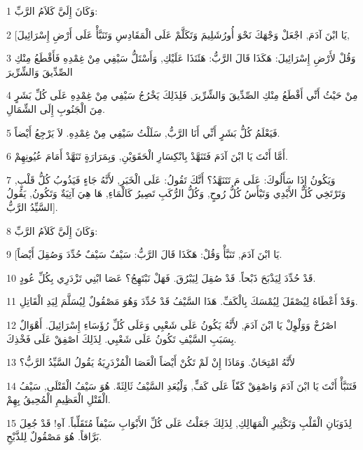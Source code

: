 \par 1 وَكَانَ إِلَيَّ كَلاَمُ الرَّبِّ:
\par 2 [يَا ابْنَ آدَمَ, اجْعَلْ وَجْهَكَ نَحْوَ أُورُشَلِيمَ وَتَكَلَّمْ عَلَى الْمَقَادِسِ وَتَنَبَّأْ عَلَى أَرْضِ إِسْرَائِيلَ,
\par 3 وَقُلْ لأَرْضِ إِسْرَائِيلَ: هَكَذَا قَالَ الرَّبُّ: هَئَنَذَا عَلَيْكِ, وَأَسْتَلُّ سَيْفِي مِنْ غِمْدِهِ فَأَقْطَعُ مِنْكِ الصِّدِّيقَ وَالشِّرِّيرَ
\par 4 مِنْ حَيْثُ أَنِّي أَقْطَعُ مِنْكِ الصِّدِّيقَ وَالشِّرِّيرَ, فَلِذَلِكَ يَخْرُجُ سَيْفِي مِنْ غِمْدِهِ عَلَى كُلِّ بَشَرٍ مِنَ الْجَنُوبِ إِلَى الشِّمَالِ.
\par 5 فَيَعْلَمُ كُلُّ بَشَرٍ أَنِّي أَنَا الرَّبُّ, سَلَلْتُ سَيْفِي مِنْ غِمْدِهِ. لاَ يَرْجِعُ أَيْضاً.
\par 6 أَمَّا أَنْتَ يَا ابْنَ آدَمَ فَتَنَهَّدْ بِانْكِسَارِ الْحَقَوَيْنِ, وَبِمَرَارَةٍ تَنَهَّدْ أَمَامَ عُيُونِهِمْ.
\par 7 وَيَكُونُ إِذَا سَأَلُوكَ: عَلَى مَ تَتَنَهَّدُ؟ أَنَّكَ تَقُولُ: عَلَى الْخَبَرِ, لأَنَّهُ جَاءٍ فَيَذُوبُ كُلُّ قَلْبٍ, وَتَرْتَخِي كُلُّ الأَيْدِي وَتَيْأَسُ كُلُّ رُوحٍ, وَكُلُّ الرُّكَبِ تَصِيرُ كَالْمَاءِ, هَا هِيَ آتِيَةٌ وَتَكُونُ, يَقُولُ السَّيِّدُ الرَّبُّ].
\par 8 وَكَانَ إِلَيَّ كَلاَمُ الرَّبِّ:
\par 9 [يَا ابْنَ آدَمَ, تَنَبَّأْ وَقُلْ: هَكَذَا قَالَ الرَّبُّ: سَيْفٌ سَيْفٌ حُدِّدَ وَصُقِلَ أَيْضاً.
\par 10 قَدْ حُدِّدَ لِيَذْبَحَ ذَبْحاً. قَدْ صُقِلَ لِيَبْرُقَ. فَهَلْ نَبْتَهِجُ؟ عَصَا ابْنِي تَزْدَرِي بِكُلِّ عُودٍ.
\par 11 وَقَدْ أَعْطَاهُ لِيُصْقَلَ لِيُمْسَكَ بِالْكَفِّ. هَذَا السَّيْفُ قَدْ حُدِّدَ وَهُوَ مَصْقُولٌ لِيُسَلَّمَ لِيَدِ الْقَاتِلِ.
\par 12 اصْرُخْ وَوَلْوِلْ يَا ابْنَ آدَمَ, لأَنَّهُ يَكُونُ عَلَى شَعْبِي وَعَلَى كُلِّ رُؤَسَاءِ إِسْرَائِيلَ. أَهْوَالٌ بِسَبَبِ السَّيْفِ تَكُونُ عَلَى شَعْبِي. لِذَلِكَ اصْفِقْ عَلَى فَخْذِكَ.
\par 13 لأَنَّهُ امْتِحَانٌ. وَمَاذَا إِنْ لَمْ تَكُنْ أَيْضاً الْعَصَا الْمُزْدَرِيَةُ يَقُولُ السَّيِّدُ الرَّبُّ؟
\par 14 فَتَنَبَّأْ أَنْتَ يَا ابْنَ آدَمَ وَاصْفِقْ كَفّاً عَلَى كَفٍّ, وَلْيُعَدِ السَّيْفُ ثَالِثَةً. هُوَ سَيْفُ الْقَتْلَى, سَيْفُ الْقَتْلِ الْعَظِيمِ الْمُحِيقُ بِهِمْ.
\par 15 لِذَوَبَانِ الْقَلْبِ وَتَكْثِيرِ الْمَهَالِكِ, لِذَلِكَ جَعَلْتُ عَلَى كُلِّ الأَبْوَابِ سَيْفاً مُتَقَلِّباً. آهِ! قَدْ جُعِلَ بَرَّاقاً. هُوَ مَصْقُولٌ لِلذَّبْحِ.
